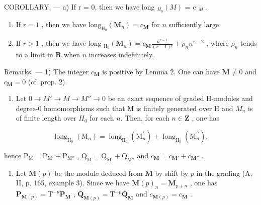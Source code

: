 COROLLARY. --- a) If r = 0, then we have long \(_{H_{0}}(M)\) = c \(_{M}\) .

\begin{enumerate}
\def\labelenumi{\alph{enumi})}
\setcounter{enumi}{1}
\item
  If \(r = 1\) , then we have \(\mathrm{long}_{\mathrm{H}_0}(\mathbf{M}_n) = c_{\mathbf{M}}\) for \(n\) sufficiently large.
\item
  If \(r > 1\) , then we have long \(_{\mathrm{H}_0}(\mathbf{M}_n) = c_{\mathbf{M}} \frac{n^{r-1}}{(r - 1)!} + \rho_n n^{r-2}\) , where \(\rho_n\) tends to a limit in \(\mathbf{R}\) when \(n\) increases indefinitely.
\end{enumerate}

Remarks. --- 1) The integer \(c_{\mathbf{M}}\) is positive by Lemma 2. One can have \(\mathbf{M} \neq 0\) and \(c_{\mathbf{M}} = 0\) (cf. prop. 2).

\begin{enumerate}
\def\labelenumi{\arabic{enumi})}
\setcounter{enumi}{1}
\tightlist
\item
  Let \(0 \to M' \to M \to M'' \to 0\) be an exact sequence of graded H-modules and degree-0 homomorphisms such that M is finitely generated over H and \(M_n\) is of finite length over \(H_0\) for each \(n\). Then, for each \(n \in \mathbf{Z}\) , one has
\end{enumerate}

\[
\operatorname{long} _ {\mathrm{H} _ {0}} \left(\mathrm{M} _ {n}\right) = \operatorname{long} _ {\mathrm{H} _ {0}} \left(\mathrm{M} _ {n} ^ {\prime}\right) + \operatorname{long} _ {\mathrm{H} _ {0}} \left(\mathrm{M} _ {n} ^ {\prime \prime}\right),
\]

hence \(\mathrm{P_M} = \mathrm{P_{M'}} + \mathrm{P_{M''}}\) , \(\mathrm{Q_M} = \mathrm{Q_{M'}} + \mathrm{Q_{M''}}\) and \(c_{\mathbf{M}} = c_{\mathbf{M'}} + c_{\mathbf{M''}}\) .

\begin{enumerate}
\def\labelenumi{\arabic{enumi})}
\setcounter{enumi}{2}
\tightlist
\item
  Let \(\mathbf{M}(p)\) be the module deduced from \(\mathbf{M}\) by shift by \(p\) in the grading (A, II, p. 165, example 3). Since we have \(\mathbf{M}(p)_n = \mathbf{M}_{p+n}\) , one has \(\mathbf{P}_{\mathbf{M}(p)} = \mathrm{T}^{-p}\mathbf{P}_{\mathbf{M}}\) , \(\mathbf{Q}_{\mathbf{M}(p)} = \mathrm{T}^{-p}\mathbf{Q}_{\mathbf{M}}\) and \(c_{\mathbf{M}(p)} = c_{\mathbf{M}}\) .
\end{enumerate}

